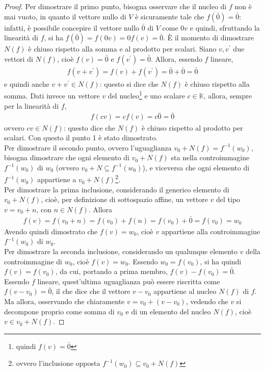\documentclass{book}
\theoremstyle{definition}
\theoremstyle{plain}
\begin{document}
\begin{proof}
  Per dimostrare il primo punto, bisogna osservare che il nucleo di $f$
  non è mai vuoto, in quanto il vettore nullo di $V$ è sicuramente tale
  che $f(\bar{0})=\bar{0}$: infatti, è possibile concepire il vettore
  nullo $\bar{0}$ di $V$ come $0v$ e quindi, sfruttando la linearità di
  $f$, si ha $f(\bar{0})=f(0v)=0f(v)=\bar{0}$.
  È il momento di dimostrare $N(f)$ è chiuso rispetto alla somma e al
  prodotto per scalari. Siano $v,v^\prime$ due vettori di $N(f)$, cioè
  $f(v)=\bar{0}$ e $f(v^\prime)=\bar{0}$. Allora, essendo $f$ lineare,
  \begin{eqnarray*}
    f(v+v^\prime)=f(v)+f(v^\prime)=\bar{0}+\bar{0}=\bar{0}
  \end{eqnarray*}
  e quindi anche $v+v^\prime\in N(f)$: questo si dice che $N(f)$ è chiuso
  rispetto alla somma. Dati invece un vettore $v$ del
  nucleo\footnote{quindi $f(v)=\bar{0}$} e uno scalare $c\in \mathds{K}$,
  allora, sempre per la linearità di $f$,
  \begin{eqnarray*}
    f(cv)=cf(v)=c\bar{0}=\bar{0}
  \end{eqnarray*}
  ovvero $cv\in N(f)$: questo dice che $N(f)$ è chiuso rispetto al
  prodotto per scalari. Con questo il punto 1 è stato dimostrato.\\
  Per dimostrare il secondo punto, ovvero l'uguaglianza $v_0+N(f)=
  f^{-1}(w_0)$, bisogna dimostrare che ogni elemento di $v_0+N(f)$ sta
  nella controimmagine $f^{-1}(w_0)$ di $w_0$ (ovvero $v_0+N\subseteq f^{-1}(w_0)$), e viceversa
  che ogni elemento di $f^{-1}(w_0)$ appartiene a $v_0+N(f)$\footnote{ovvero l'inclusione opposta
    $f^{-1}(w_0) \subseteq v_0+N(f)$}.\\
  Per dimostrare la prima inclusione, considerando il generico elemento di $v_0+N(f)$, cioè, per
  definizione di sottospazio affine, un vettore $v$ del tipo $v=v_0+n$, con $n\in N(f)$. Allora
  \begin{eqnarray*}
    f(v)=f(v_0+n)=f(v_0)+f(n)=f(v_0)+\bar{0}=f(v_0)=w_0
  \end{eqnarray*}
  Avendo quindi dimostrato che $f(v)=w_0$, cioè $v$ appartiene alla controimmagine $f^{-1}(w_0)$ di
  $w_0$. \\
  Per dimostrare la seconda inclusione, considerando un qualunque elemento $v$ della controimmagine
  di $w_0$, cioè $f(v)=w_0$. Essendo $w_0=f(v_0)$, si ha quindi $f(v)=f(v_0)$, da cui, portando a prima
  membro, $f(v)-f(v_0)=\bar{0}$. Essendo $f$ lineare, quest'ultima uguaglianza può essere riscritta
  come $f(v-v_0)=\bar{0}$, il che dice che il vettore $v-v_0$ appartiene al nucleo $N(f)$ di $f$.
  Ma allora, osservando che chiaramente $v=v_0+(v-v_0)$, vedendo che $v$ si decompone proprio come somma
  di $v_0$ e di un elemento del nucleo $N(f)$, cioè $v\in v_0+N(f)$.
\end{proof}
\end{document}
